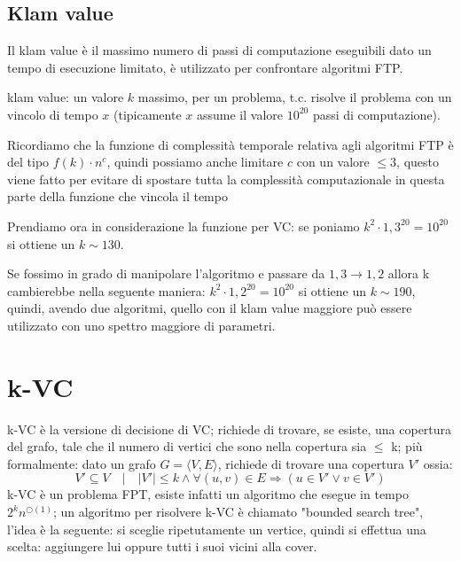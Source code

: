 \documentclass[12pt,a4paper]{article}
\begin{document}
\subsection{Klam value}
Il klam value è il massimo numero di passi di computazione eseguibili dato un tempo di esecuzione limitato, è utilizzato per confrontare algoritmi FTP.

klam value: un valore $k$ massimo, per un problema, t.c. risolve il problema con un vincolo di tempo $x$ (tipicamente $x$ assume il valore $10^{20}$ passi di computazione).

Ricordiamo che la funzione di complessità temporale relativa agli algoritmi FTP è del tipo $f(k) \cdot n^c$, quindi possiamo anche limitare $c$ con un valore $\leq3$, questo viene fatto per evitare di spostare tutta la complessità computazionale in questa parte della funzione che vincola il tempo

Prendiamo ora in considerazione la funzione per VC: se poniamo $k^2 \cdot 1,3^{20} = 10^{20}$ si ottiene un $k \sim 130$.

Se fossimo in grado di manipolare l'algoritmo e passare da $1,3 \rightarrow 1,2$ allora k cambierebbe nella seguente maniera: $k^2 \cdot 1,2^{20} = 10^{20}$ si ottiene un $k \sim 190$, quindi, avendo due algoritmi, quello con il klam value maggiore può essere utilizzato con uno spettro maggiore di parametri.

\section{k-VC}
k-VC è la versione di decisione di VC; richiede di trovare, se esiste, una copertura del grafo, tale che il numero di vertici che sono nella copertura sia $\leq$ k; più formalmente: dato un grafo $G = \langle V, E\rangle$, richiede di trovare una copertura $V'$ ossia: $$ V'\subseteq V \quad \vert \quad \vert V' \vert \leq k \wedge \forall (u, v) \in E \Rightarrow (u \in V' \vee v \in V') $$
k-VC è un problema FPT, esiste infatti un algoritmo che esegue in tempo $2^k n^{\bigcirc(1)}$; un algoritmo per risolvere k-VC è chiamato "bounded search tree", l'idea è la seguente: si sceglie ripetutamente un vertice, quindi si effettua una scelta: aggiungere lui oppure tutti i suoi vicini alla cover.
\end{document}
